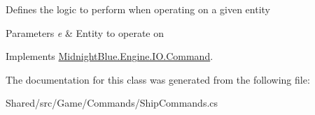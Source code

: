 Defines the logic to perform when operating on a given entity 


\begin{DoxyParams}{Parameters}
{\em e} & Entity to operate on\\
\hline
\end{DoxyParams}


Implements \hyperlink{class_midnight_blue_1_1_engine_1_1_i_o_1_1_command_ae641d2c1a9db17f03ee6b7854b00a9d2}{Midnight\+Blue.\+Engine.\+I\+O.\+Command}.



The documentation for this class was generated from the following file\+:\begin{DoxyCompactItemize}
\item 
Shared/src/\+Game/\+Commands/Ship\+Commands.\+cs\end{DoxyCompactItemize}
